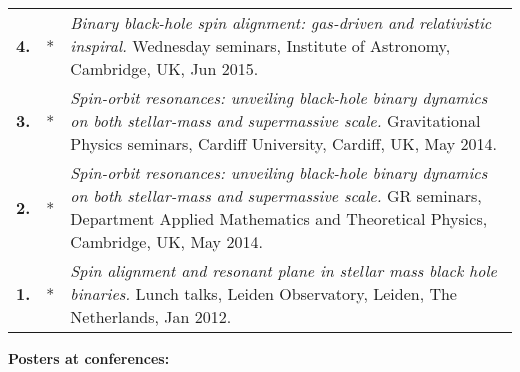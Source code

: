 \documentclass[11pt,letterpaper,sans]{moderncv}   %
\begin{document}
{\begin{longtable}{rp{0.4cm}p{15.8cm}}
%
\textbf{4.} & *& \textit{Binary black-hole spin alignment: gas-driven and relativistic inspiral.}
\newline{} 
Wednesday seminars, Institute of Astronomy, Cambridge, UK, Jun 2015.\vspace{0.05cm}\\
%
\textbf{3.} & *& \textit{Spin-orbit resonances: unveiling black-hole binary dynamics on both stellar-mass and supermassive scale.}
\newline{} 
Gravitational Physics seminars, Cardiff University, Cardiff, UK, May 2014.
\vspace{0.05cm}\\
%
\textbf{2.} & *& \textit{Spin-orbit resonances: unveiling black-hole binary dynamics on both stellar-mass and supermassive scale.}
\newline{} 
GR seminars, Department Applied Mathematics and Theoretical Physics, Cambridge, UK, May 2014.
\vspace{0.05cm}\\
%
\textbf{1.} & *& \textit{Spin alignment and resonant plane in stellar mass black hole binaries.}
\newline{} 
Lunch talks, Leiden Observatory, Leiden, The Netherlands, Jan 2012.
\vspace{0.05cm}\\
%
\end{longtable}
}


\textcolor{color1}{\textbf{Posters at conferences:}}
\end{document}
